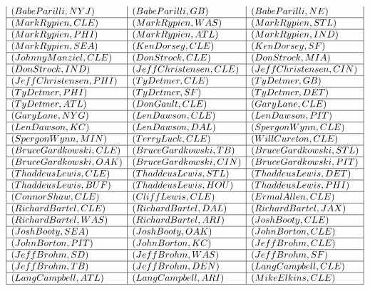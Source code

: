 \documentclass{ximera}
\begin{document}
\begin{center}
\[\begin{array}{|l|l|l|}
(Babe Parilli, NYJ) & (Babe Parilli, GB) & (Babe Parilli, NE) \\\hline 
(Mark Rypien, CLE) & (Mark Rypien, WAS) & (Mark Rypien, STL) \\\hline 
(Mark Rypien, PHI) & (Mark Rypien, ATL) & (Mark Rypien, IND) \\\hline 
(Mark Rypien, SEA) & (Ken Dorsey, CLE) & (Ken Dorsey, SF) \\\hline 
(Johnny Manziel, CLE) & (Don Strock, CLE) & (Don Strock, MIA) \\\hline 
(Don Strock, IND) & (Jeff Christensen, CLE) & (Jeff Christensen, CIN) \\\hline 
(Jeff Christensen, PHI) & (Ty Detmer, CLE) & (Ty Detmer, GB) \\\hline 
(Ty Detmer, PHI) & (Ty Detmer, SF) & (Ty Detmer, DET) \\\hline 
(Ty Detmer, ATL) & (Don Gault, CLE) & (Gary Lane, CLE) \\\hline 
(Gary Lane, NYG) & (Len Dawson, CLE) & (Len Dawson, PIT) \\\hline 
(Len Dawson, KC) & (Len Dawson, DAL) & (Spergon Wynn, CLE) \\\hline 
(Spergon Wynn, MIN) & (Terry Luck, CLE) & (Will Cureton, CLE) \\\hline 
(Bruce Gardkowski, CLE) & (Bruce Gardkowski, TB) & (Bruce Gardkowski, STL) \\\hline 
(Bruce Gardkowski, OAK) & (Bruce Gardkowski, CIN) & (Bruce Gardkowski, PIT) \\\hline 
(Thaddeus Lewis, CLE) & (Thaddeus Lewis, STL) & (Thaddeus Lewis, DET) \\\hline 
(Thaddeus Lewis, BUF) & (Thaddeus Lewis, HOU) & (Thaddeus Lewis, PHI) \\\hline 
(Connor Shaw, CLE) & (Cliff Lewis, CLE) & (Ermal Allen, CLE) \\\hline 
(Richard Bartel, CLE) & (Richard Bartel, DAL) & (Richard Bartel, JAX) \\\hline
(Richard Bartel, WAS) & (Richard Bartel, ARI) & (Josh Booty, CLE) \\\hline 
(Josh Booty, SEA) & (Josh Booty, OAK) & (John Borton, CLE) \\\hline
(John Borton, PIT) & (John Borton, KC) & (Jeff Brohm, CLE) \\\hline 
(Jeff Brohm, SD) & (Jeff Brohm, WAS) & (Jeff Brohm, SF) \\\hline 
(Jeff Brohm, TB) & (Jeff Brohm, DEN) & (Lang Campbell, CLE) \\\hline 
(Lang Campbell, ATL) & (Lang Campbell, ARI) & (Mike Elkins, CLE) \\\hline 

\end{array}\]
\end{center}
\end{document}
